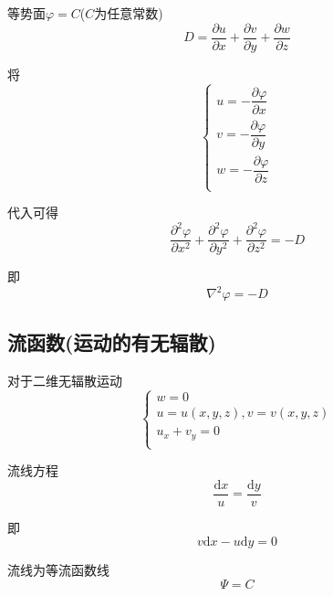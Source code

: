 \documentclass[a4paper,oneside]{ctexbook}
\begin{document}
等势面\(\varphi=C\)(\(C\)为任意常数)
\begin{equation}
    D=\dfrac{\partial{u}}{\partial{x}}+\dfrac{\partial{v}}{\partial{y}}+\dfrac{\partial{w}}{\partial{z}}
\end{equation}

将
\begin{equation}
\left\{
\begin{array}{c}
    u=-\dfrac{\partial{\varphi}}{\partial{x}}\\
    v=-\dfrac{\partial{\varphi}}{\partial{y}}\\
    w=-\dfrac{\partial{\varphi}}{\partial{z}}\\
\end{array}
\right.
\end{equation}

代入可得
\begin{equation}
    \dfrac{\partial^2\varphi}{\partial{x^2}}+\dfrac{\partial^2\varphi}{\partial{y^2}}+\dfrac{\partial^2\varphi}{\partial{z^2}}=-D
\end{equation}

即
\begin{equation}
    \nabla^2\varphi=-D
\end{equation}

\subsection{流函数(运动的有无辐散)}

对于二维无辐散运动
\begin{equation}
\left\{
\begin{array}{l}
    w=0\\
    u=u(x,y,z),v=v(x,y,z)\\
    u_x+v_y=0\\
\end{array}
\right.
\end{equation}

流线方程
\begin{equation}
    \dfrac{\mathrm{d}x}{u}=\dfrac{\mathrm{d}y}{v}
\end{equation}

即
\begin{equation}
    v\mathrm{d}x-u\mathrm{d}y=0
\end{equation}

流线为等流函数线
\begin{equation}
    \Psi=C
\end{equation}
\end{document}
